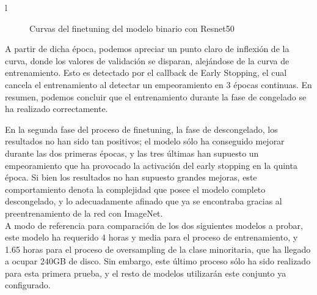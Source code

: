 l\begin{figure}[H]
	\centering
	\caption{Curvas del finetuning del modelo binario con Resnet50}
	\label{fig:curvasrensetbinaria}
	
\end{figure}

A partir de dicha época, podemos apreciar un punto claro de inflexión de la curva, donde los valores de validación se disparan, alejándose de la curva de entrenamiento. Esto es detectado por el callback de Early Stopping, el cual cancela el entrenamiento al detectar un empeoramiento en 3 épocas continuas. En resumen, podemos concluir que el entrenamiento durante la fase de congelado se ha realizado correctamente.

En la segunda fase del proceso de finetuning, la fase de descongelado, los resultados no han sido tan positivos; el modelo sólo ha conseguido mejorar durante las dos primeras épocas, y las tres últimas han supuesto un empeoramiento que ha provocado la activación del early stopping en la quinta época. Si bien los resultados no han supuesto grandes mejoras, este comportamiento denota la complejidad que posee el modelo completo descongelado, y lo adecuadamente afinado que ya se encontraba gracias al preentrenamiento de la red con ImageNet.\\

A modo de referencia para comparación de los dos siguientes modelos a probar, este modelo ha requerido 4 horas y media para el proceso de entrenamiento, y 1.65 horas para el proceso de oversampling de la clase minoritaria, que ha llegado a ocupar 240GB de disco. Sin embargo, este último proceso sólo ha sido realizado para esta primera prueba, y el resto de modelos utilizarán este conjunto ya configurado.\\

